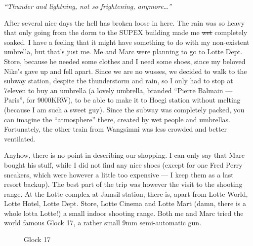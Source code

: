 \begin{post}
	\begin{content}
\textit{``Thunder and lightning, not so frightening, anymore{\ldots}''}

After several nice days the hell has broken loose in here. The rain was so heavy that only going from the dorm to the SUPEX building made me \sout{wet} completely soaked. I have a feeling that it might have something to do with my non-existent umbrella, but that's just me. Me and Marc were planning to go to Lotte Dept. Store, because he needed some clothes and I need some shoes, since my beloved Nike's gave up and fell apart. Since we are no wusses, we decided to walk to the subway station, despite the thunderstorm and rain, so I only had to stop at 7eleven to buy an umbrella (a lovely umbrella, branded ``Pierre Balmain --- Paris'', for 9000KRW), to be able to make it to Hoegi station without melting (because I am such a sweet guy). Since the subway was completely packed, you can imagine the ``atmosphere'' there, created by wet people and umbrellas. Fortunately, the other train from Wangsimni was less crowded and better ventilated.

Anyhow, there is no point in describing our shopping. I can only say that Marc bought his stuff, while I did not find any nice shoes (except for one Fred Perry sneakers, which were however a little too expensive --- I keep them as a last resort backup). The best part of the trip was however the visit to the shooting range. At the Lotte complex at Jamsil station, there is, apart from Lotte World, Lotte Hotel, Lotte Dept. Store, Lotte Cinema and Lotte Mart (damn, there is a whole lotta Lotte!) a small indoor shooting range. Both me and Marc tried the world famous Glock 17, a rather small 9mm semi-automatic gun.

\begin{figure}[h]
\centering
{}
\caption{Glock 17}
\end{figure}


\end{content}
\end{post}
